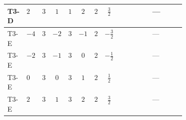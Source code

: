 \documentclass[8pt]{article}
\begin{document}
\begin{landscape}
\begin{longtable}{@{}llcccccc >{\raggedright\arraybackslash}p{0.21\linewidth} >{\raggedright\arraybackslash}p{0.21\linewidth}@{}}
\midrule
T3-D & $2$ & $3$ & $1$ & $1$ & $2$ & $2$ & $\frac{3}{2}$ & \scriptsize\adjustbox{max width=\linewidth}{$\begin{gathered} -\frac{{g_2}^3}{2}\end{gathered}$} & --- \\
\midrule
T3-E & $-4$ & $3$ & $-2$ & $3$ & $-1$ & $2$ & $-\frac{3}{2}$ & \scriptsize\adjustbox{max width=\linewidth}{$\begin{gathered} \frac{{g_2}^3}{6}\end{gathered}$} & --- \\
\midrule
T3-E & $-2$ & $3$ & $-1$ & $3$ & $0$ & $2$ & $-\frac{1}{2}$ & \scriptsize\adjustbox{max width=\linewidth}{$\begin{gathered} \frac{{g_2}^3}{6}\end{gathered}$} & --- \\
\midrule
T3-E & $0$ & $3$ & $0$ & $3$ & $1$ & $2$ & $\frac{1}{2}$ & \scriptsize\adjustbox{max width=\linewidth}{$\begin{gathered} \frac{{g_2}^3}{6}\end{gathered}$} & --- \\
\midrule
T3-E & $2$ & $3$ & $1$ & $3$ & $2$ & $2$ & $\frac{3}{2}$ & \scriptsize\adjustbox{max width=\linewidth}{$\begin{gathered} \frac{{g_2}^3}{6}\end{gathered}$} & --- \\
\midrule
\bottomrule
\end{longtable}
\clearpage

\end{landscape}
\end{document}
